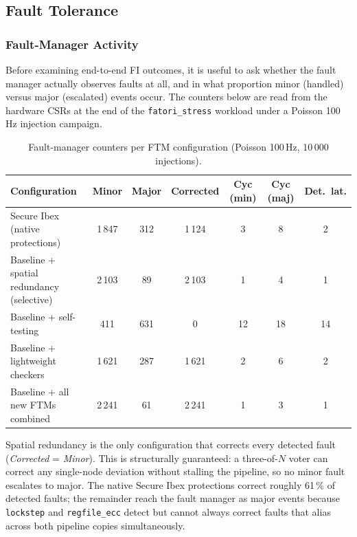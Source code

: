 \subsection{Fault Tolerance}
\label{sec:ft_results}

\subsubsection{Fault-Manager Activity}
\label{sec:ft_counters_results}

Before examining end-to-end \ac{FI} outcomes, it is useful to ask whether the fault manager
actually observes faults at all, and in what proportion minor (handled) versus major (escalated)
events occur. The counters below are read from the hardware CSRs at the end of the
\texttt{fatori\_stress} workload under a Poisson 100\,Hz injection campaign.

\begin{table}[H]
\centering
\caption{Fault-manager counters per \ac{FTM} configuration (Poisson 100\,Hz, 10\,000 injections).}
\label{tab:ft_counters_results}
\footnotesize
\begin{tabularx}{\textwidth}{lcccccc}
\toprule
\textbf{Configuration} & \textbf{Minor} & \textbf{Major} & \textbf{Corrected}
  & \textbf{Cyc (min)} & \textbf{Cyc (maj)} & \textbf{Det.\ lat.} \\
\midrule
Secure Ibex (native protections)          & 1\,847 & 312 & 1\,124 & 3 & 8  & 2 \\
Baseline + spatial redundancy (selective) & 2\,103 &  89 & 2\,103 & 1 & 4  & 1 \\
Baseline + self-testing                   &   411  & 631 &      0 & 12 & 18 & 14 \\
Baseline + lightweight checkers           & 1\,621 & 287 & 1\,621 & 2 & 6  & 2 \\
Baseline + all new \acp{FTM} combined     & 2\,241 &  61 & 2\,241 & 1 & 3  & 1 \\
\bottomrule
\end{tabularx}
\end{table}

Spatial redundancy is the only configuration that corrects every detected fault
(\textit{Corrected} = \textit{Minor}). This is structurally guaranteed: a three-of-$N$ voter
can correct any single-node deviation without stalling the pipeline, so no minor fault escalates
to major. The native Secure Ibex protections correct roughly 61\,\% of detected faults; the
remainder reach the fault manager as major events because \texttt{lockstep} and \texttt{regfile\_ecc}
detect but cannot always correct faults that alias across both pipeline copies simultaneously.

